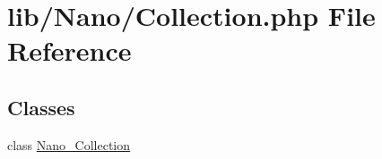\hypertarget{Collection_8php}{
\section{lib/Nano/Collection.php File Reference}
\label{Collection_8php}
}
\subsection*{Classes}
\begin{CompactItemize}
\item 
class \hyperlink{classNano__Collection}{Nano\_\-Collection}
\end{CompactItemize}
